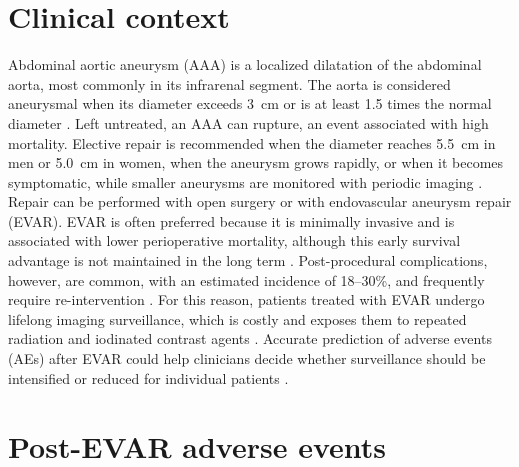 \section{Clinical context}
Abdominal aortic aneurysm (AAA) is a localized dilatation of the abdominal aorta, most commonly in its infrarenal segment. The aorta is considered aneurysmal when its diameter exceeds 3~cm or is at least 1.5 times the normal diameter \cite{sakalihasan_abdominal_2018, katsoudas_hemodynamic_2026}. Left untreated, an AAA can rupture, an event associated with high mortality. Elective repair is recommended when the diameter reaches 5.5~cm in men or 5.0~cm in women, when the aneurysm grows rapidly, or when it becomes symptomatic, while smaller aneurysms are monitored with periodic imaging \cite{wanhainen_editors_2024}.
Repair can be performed with open surgery or with endovascular aneurysm repair (EVAR). EVAR is often preferred because it is minimally invasive and is associated with lower perioperative mortality, although this early survival advantage is not maintained in the long term \cite{braak_scoping_2026, wanhainen_editors_2024} . Post-procedural complications, however, are common, with an estimated incidence of 18--30\%, and frequently require re-intervention \cite{daye_complications_2018}. %
For this reason, patients treated with EVAR undergo lifelong imaging surveillance, which is costly and exposes them to repeated radiation and iodinated contrast agents \cite{wanhainen_editors_2024}. Accurate prediction of adverse events (AEs) after EVAR could help clinicians decide whether surveillance should be intensified or reduced for individual patients \cite{peng_endoleak_2026} .

\section{Post-EVAR adverse events}

